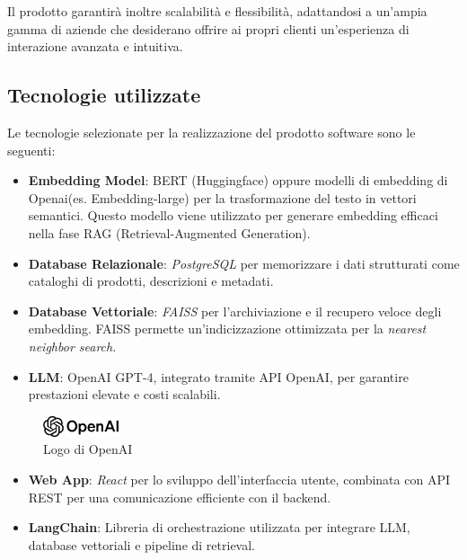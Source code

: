 Il prodotto garantirà inoltre scalabilità e flessibilità, adattandosi a un’ampia gamma di aziende che desiderano offrire ai propri clienti un’esperienza di interazione avanzata e intuitiva.


\subsection{Tecnologie utilizzate}
Le tecnologie selezionate per la realizzazione del prodotto software sono le seguenti:

\begin{itemize}

    \item \textbf{Embedding Model}: BERT (Huggingface) oppure modelli di embedding di Openai(es. Embedding-large) per la trasformazione del testo in vettori semantici. Questo modello viene utilizzato per generare embedding efficaci nella fase RAG (Retrieval-Augmented Generation).
    \item \textbf{Database Relazionale}: \textit{PostgreSQL} per memorizzare i dati strutturati come cataloghi di prodotti, descrizioni e metadati.
    \item \textbf{Database Vettoriale}: \textit{FAISS} per l'archiviazione e il recupero veloce degli embedding. FAISS permette un'indicizzazione ottimizzata per la \textit{nearest neighbor search}.
    \item \textbf{LLM}: OpenAI GPT-4, integrato tramite API OpenAI, per garantire prestazioni elevate e costi scalabili.

\end{itemize}
\begin{figure}[H]

    \centering
    \includegraphics[width=0.2\textwidth]{img/openai-lockup.png}
    \caption{Logo di OpenAI}
    \label{fig:openai_logo}

\end{figure}

\begin{itemize}
    \item \textbf{Web App}: \textit{React} per lo sviluppo dell’interfaccia utente, combinata con API REST per una comunicazione efficiente con il backend.
    \item \textbf{LangChain}: Libreria di orchestrazione utilizzata per integrare LLM, database vettoriali e pipeline di retrieval.
\end{itemize}

